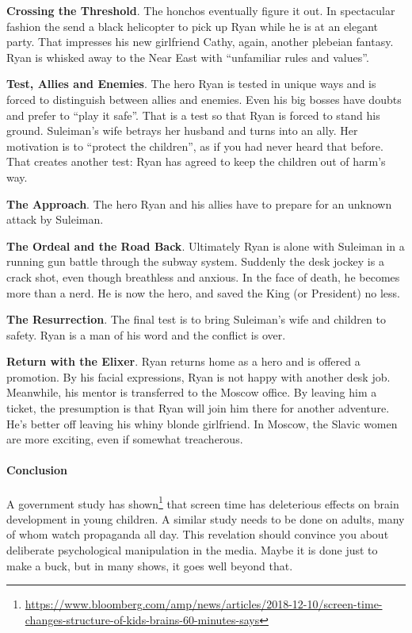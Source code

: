 \textbf{Crossing the Threshold}. The honchos eventually figure it out. In spectacular fashion the send a black helicopter to pick up Ryan while he is at an elegant party. That impresses his new girlfriend Cathy, again, another plebeian fantasy. Ryan is whisked away to the Near East with ``unfamiliar rules and values''.

\textbf{Test, Allies and Enemies}. The hero Ryan is tested in unique ways and is forced to distinguish between allies and enemies. Even his big bosses have doubts and prefer to ``play it safe''. That is a test so that Ryan is forced to stand his ground. Suleiman's wife betrays her husband and turns into an ally. Her motivation is to ``protect the children'', as if you had never heard that before. That creates another test: Ryan has agreed to keep the children out of harm's way.

\textbf{The Approach}. The hero Ryan and his allies have to prepare for an unknown attack by Suleiman.

\textbf{The Ordeal and the Road Back}. Ultimately Ryan is alone with Suleiman in a running gun battle through the subway system. Suddenly the desk jockey is a crack shot, even though breathless and anxious. In the face of death, he becomes more than a nerd. He is now the hero, and saved the King (or President) no less.

\textbf{The Resurrection}. The final test is to bring Suleiman's wife and children to safety. Ryan is a man of his word and the conflict is over.

\textbf{Return with the Elixer}. Ryan returns home as a hero and is offered a promotion. By his facial expressions, Ryan is not happy with another desk job. Meanwhile, his mentor is transferred to the Moscow office. By leaving him a ticket, the presumption is that Ryan will join him there for another adventure. He's better off leaving his whiny blonde girlfriend. In Moscow, the Slavic women are more exciting, even if somewhat treacherous.

\paragraph{Conclusion}


A government study has shown\footnote{\url{https://www.bloomberg.com/amp/news/articles/2018-12-10/screen-time-changes-structure-of-kids-brains-60-minutes-says}} that screen time has deleterious effects on brain development in young children. A similar study needs to be done on adults, many of whom watch propaganda all day. This revelation should convince you about deliberate psychological manipulation in the media. Maybe it is done just to make a buck, but in many shows, it goes well beyond that.



